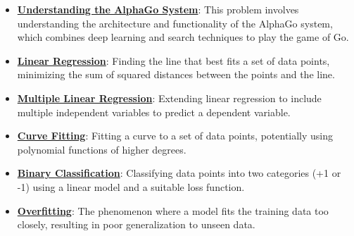 \documentclass{article}%
\begin{document}
\begin{itemize}[leftmargin=*]
\item \href{https://purdue.brightspace.com/d2l/common/assets/pdfjs-d2l-dist/1.0.14-legacy/web/viewer.html?file=%2Fcontent%2Fenforced%2F1095467-wl.202510.CS.24300.001%2F02L2-Intro.pdf%3Fou%3D1095467&lang=en-us&container=d2l-fileviewer-rendered-pdf&fullscreen=d2l-fileviewer-rendered-pdf-dialog&height=667#page=50}{\textbf{Understanding the AlphaGo System}}: This problem involves understanding the architecture and functionality of the AlphaGo system, which combines deep learning and search techniques to play the game of Go.%
\item \href{https://purdue.brightspace.com/d2l/common/assets/pdfjs-d2l-dist/1.0.14-legacy/web/viewer.html?file=%2Fcontent%2Fenforced%2F1095467-wl.202510.CS.24300.001%2F05L2-ML Basics.pdf%3Fou%3D1095467&lang=en-us&container=d2l-fileviewer-rendered-pdf&fullscreen=d2l-fileviewer-rendered-pdf-dialog&height=667#page=6}{\textbf{Linear Regression}}: Finding the line that best fits a set of data points, minimizing the sum of squared distances between the points and the line.%
\item \href{https://purdue.brightspace.com/d2l/common/assets/pdfjs-d2l-dist/1.0.14-legacy/web/viewer.html?file=%2Fcontent%2Fenforced%2F1095467-wl.202510.CS.24300.001%2F05L2-ML Basics.pdf%3Fou%3D1095467&lang=en-us&container=d2l-fileviewer-rendered-pdf&fullscreen=d2l-fileviewer-rendered-pdf-dialog&height=667#page=11}{\textbf{Multiple Linear Regression}}: Extending linear regression to include multiple independent variables to predict a dependent variable.%
\item \href{https://purdue.brightspace.com/d2l/common/assets/pdfjs-d2l-dist/1.0.14-legacy/web/viewer.html?file=%2Fcontent%2Fenforced%2F1095467-wl.202510.CS.24300.001%2F05L2-ML Basics.pdf%3Fou%3D1095467&lang=en-us&container=d2l-fileviewer-rendered-pdf&fullscreen=d2l-fileviewer-rendered-pdf-dialog&height=667#page=13}{\textbf{Curve Fitting}}: Fitting a curve to a set of data points, potentially using polynomial functions of higher degrees.%
\item \href{https://purdue.brightspace.com/d2l/common/assets/pdfjs-d2l-dist/1.0.14-legacy/web/viewer.html?file=%2Fcontent%2Fenforced%2F1095467-wl.202510.CS.24300.001%2F05L2-ML Basics.pdf%3Fou%3D1095467&lang=en-us&container=d2l-fileviewer-rendered-pdf&fullscreen=d2l-fileviewer-rendered-pdf-dialog&height=667#page=20}{\textbf{Binary Classification}}: Classifying data points into two categories (+1 or -1) using a linear model and a suitable loss function.%
\item \href{https://purdue.brightspace.com/d2l/common/assets/pdfjs-d2l-dist/1.0.14-legacy/web/viewer.html?file=%2Fcontent%2Fenforced%2F1095467-wl.202510.CS.24300.001%2F05L2-ML Basics.pdf%3Fou%3D1095467&lang=en-us&container=d2l-fileviewer-rendered-pdf&fullscreen=d2l-fileviewer-rendered-pdf-dialog&height=667#page=14}{\textbf{Overfitting}}: The phenomenon where a model fits the training data too closely, resulting in poor generalization to unseen data.%

\end{itemize}
\end{document}
